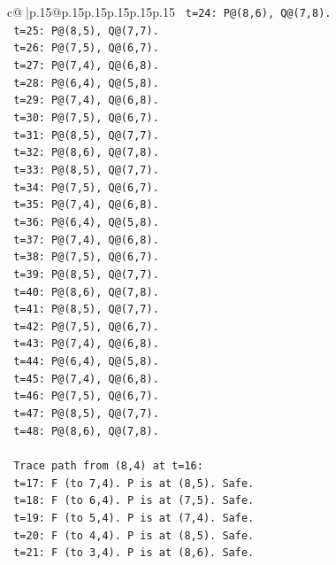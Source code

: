 \documentclass{article}
\begin{document}
{\begin{supertabular}{c@{$\;$}|p{.15\linewidth}@{}p{.15\linewidth}p{.15\linewidth}p{.15\linewidth}p{.15\linewidth}p{.15\linewidth}}
{{{\texttt{    t=24: P@(8,6), Q@(7,8).} \\
\texttt{    t=25: P@(8,5), Q@(7,7).} \\
\texttt{    t=26: P@(7,5), Q@(6,7).} \\
\texttt{    t=27: P@(7,4), Q@(6,8).} \\
\texttt{    t=28: P@(6,4), Q@(5,8).} \\
\texttt{    t=29: P@(7,4), Q@(6,8).} \\
\texttt{    t=30: P@(7,5), Q@(6,7).} \\
\texttt{    t=31: P@(8,5), Q@(7,7).} \\
\texttt{    t=32: P@(8,6), Q@(7,8).} \\
\texttt{    t=33: P@(8,5), Q@(7,7).} \\
\texttt{    t=34: P@(7,5), Q@(6,7).} \\
\texttt{    t=35: P@(7,4), Q@(6,8).} \\
\texttt{    t=36: P@(6,4), Q@(5,8).} \\
\texttt{    t=37: P@(7,4), Q@(6,8).} \\
\texttt{    t=38: P@(7,5), Q@(6,7).} \\
\texttt{    t=39: P@(8,5), Q@(7,7).} \\
\texttt{    t=40: P@(8,6), Q@(7,8).} \\
\texttt{    t=41: P@(8,5), Q@(7,7).} \\
\texttt{    t=42: P@(7,5), Q@(6,7).} \\
\texttt{    t=43: P@(7,4), Q@(6,8).} \\
\texttt{    t=44: P@(6,4), Q@(5,8).} \\
\texttt{    t=45: P@(7,4), Q@(6,8).} \\
\texttt{    t=46: P@(7,5), Q@(6,7).} \\
\texttt{    t=47: P@(8,5), Q@(7,7).} \\
\texttt{    t=48: P@(8,6), Q@(7,8).} \\
\\ 
\texttt{    Trace path from (8,4) at t=16:} \\
\texttt{    t=17: F (to 7,4). P is at (8,5). Safe.} \\
\texttt{    t=18: F (to 6,4). P is at (7,5). Safe.} \\
\texttt{    t=19: F (to 5,4). P is at (7,4). Safe.} \\
\texttt{    t=20: F (to 4,4). P is at (8,5). Safe.} \\
\texttt{    t=21: F (to 3,4). P is at (8,6). Safe.} \\
}}}
\end{supertabular}}
\end{document}

